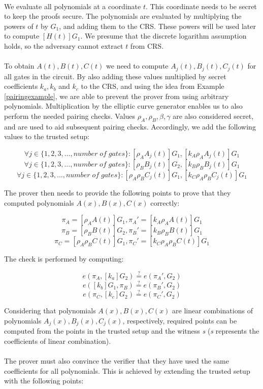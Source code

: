 \noindent
\\
We evaluate all polynomials at a coordinate $t$. This coordinate needs to be secret to keep the proofs secure. The polynomials are evaluated by multiplying the powers of $t$ by $G_1$, and adding them to the CRS. These powers will be used later to compute $[H(t)]G_1$. We presume that the discrete logarithm assumption holds, so the adversary cannot extract $t$ from CRS.\\
\\
To obtain $A(t), B(t), C(t)$ we need to compute $A_j(t), B_j(t), C_j(t)$ for all gates in the circuit. By also adding these values multiplied by secret coefficients $k_a, k_b$ and $k_c$ to the CRS, and using the idea from Example \ref{pairingexample}, we are able to prevent the prover from using arbitrary polynomials. Multiplication by the elliptic curve generator enables us to also perform the needed pairing checks. Values $\rho_A, \rho_B, \beta, \gamma$ are also considered secret, and are used to aid subsequent pairing checks. Accordingly, we add the following values to the trusted setup:

$$\forall j \in \{1, 2, 3, \ldots, number\;of\;gates\} : [\rho_A A_j(t)]G_1, [k_A \rho_A A_j(t)]G_1 $$
$$\forall j \in \{1, 2, 3, \ldots, number\;of\;gates\} : [\rho_B B_j(t)]G_2, [k_B \rho_B B_j(t)]G_1 $$ 
$$\forall j \in \{1, 2, 3, \ldots, number\;of\;gates\} : [\rho_A \rho_B C_j(t)]G_1, [k_C \rho_A \rho_B C_j(t)]G_1 $$ 

The prover then needs to provide the following points to prove that they computed polynomials $A(x), B(x), C(x)$ correctly:

$$\pi_A = [\rho_A A(t)]G_1, \pi_A' = [k_A \rho_A A(t)]G_1$$
$$\pi_B = [\rho_B B(t)]G_2, \pi_B' = [k_B \rho_B B(t)]G_1$$
$$\pi_C = [\rho_A \rho_B C(t)]G_1, \pi_C' = [k_C \rho_A \rho_B C(t)]G_1$$

The check is performed by computing:

$$ e(\pi_A, [k_a]G_2) \stackrel{?}{=} e(\pi_A', G_2) $$
$$ e([k_b]G_1, \pi_B) \stackrel{?}{=} e(\pi_B', G_2) $$
$$ e(\pi_C, [k_c]G_2) \stackrel{?}{=} e(\pi_C', G_2) $$

\noindent Considering that polynomials $A(x), B(x), C(x)$ are linear combinations of polynomials $A_j(x), B_j(x), C_j(x)$, respectively, required points can be computed from the points in the trusted setup and the witness \textit{s} (\textit{s} represents the coefficients of linear combination).\\
\\
The prover must also convince the verifier that they have used the same coefficients for all polynomials. This is achieved by extending the trusted setup with the following points:

